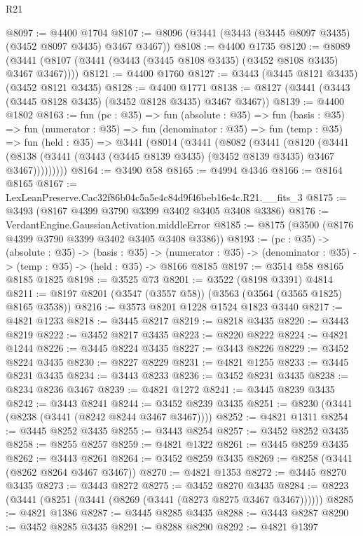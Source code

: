 \begin{lexlean}{R21}
\begin{coremodule}
@8097 := @4400 @1704
@8107 := @8096 (@3441 (@3443 (@3445 @8097 @3435) (@3452 @8097 @3435) @3467 @3467))
@8108 := @4400 @1735
@8120 := @8089 (@3441 (@8107 (@3441 (@3443 (@3445 @8108 @3435) (@3452 @8108 @3435) @3467 @3467))))
@8121 := @4400 @1760
@8127 := @3443 (@3445 @8121 @3435) (@3452 @8121 @3435)
@8128 := @4400 @1771
@8138 := @8127 (@3441 (@3443 (@3445 @8128 @3435) (@3452 @8128 @3435) @3467 @3467))
@8139 := @4400 @1802
@8163 := fun (pc : @35) =>
  fun (absolute : @35) =>
  fun (basis : @35) =>
  fun (numerator : @35) =>
  fun (denominator : @35) =>
  fun (temp : @35) =>
  fun (held : @35) =>
  @3441
    (@8014
      (@3441
        (@8082
          (@3441
            (@8120
              (@3441
                (@8138 (@3441 (@3443 (@3445 @8139 @3435) (@3452 @8139 @3435) @3467 @3467)))))))))
@8164 := @3490 @58
@8165 := @4994 @4346
@8166 := @8164 @8165
@8167 := LexLeanPreserve.Cac32f86b04c5a5e4c84d9f46beb16e4c.R21.__fits_3
@8175 := @3493 (@8167 @4399 @3790 @3399 @3402 @3405 @3408 @3386)
@8176 := VerdantEngine.GaussianActivation.middleError
@8185 := @8175 (@3500 (@8176 @4399 @3790 @3399 @3402 @3405 @3408 @3386))
@8193 := (pc : @35) ->
  (absolute : @35) ->
  (basis : @35) ->
  (numerator : @35) -> (denominator : @35) -> (temp : @35) -> (held : @35) -> @8166 @8185
@8197 := @3514 @58 @8165 @8185 @1825
@8198 := @3525 @73
@8201 := @3522 (@8198 @3391) @4814
@8211 := @8197 @8201 (@3547 (@3557 @58)) (@3563 (@3564 (@3565 @1825) @8165 @3538))
@8216 := @3573 @8201 @1228 @1524 @1823 @3440
@8217 := @4821 @1233
@8218 := @3445 @8217
@8219 := @8218 @3435
@8220 := @3443 @8219
@8222 := @3452 @8217 @3435
@8223 := @8220 @8222
@8224 := @4821 @1244
@8226 := @3445 @8224 @3435
@8227 := @3443 @8226
@8229 := @3452 @8224 @3435
@8230 := @8227 @8229
@8231 := @4821 @1255
@8233 := @3445 @8231 @3435
@8234 := @3443 @8233
@8236 := @3452 @8231 @3435
@8238 := @8234 @8236 @3467
@8239 := @4821 @1272
@8241 := @3445 @8239 @3435
@8242 := @3443 @8241
@8244 := @3452 @8239 @3435
@8251 := @8230 (@3441 (@8238 (@3441 (@8242 @8244 @3467 @3467))))
@8252 := @4821 @1311
@8254 := @3445 @8252 @3435
@8255 := @3443 @8254
@8257 := @3452 @8252 @3435
@8258 := @8255 @8257
@8259 := @4821 @1322
@8261 := @3445 @8259 @3435
@8262 := @3443 @8261
@8264 := @3452 @8259 @3435
@8269 := @8258 (@3441 (@8262 @8264 @3467 @3467))
@8270 := @4821 @1353
@8272 := @3445 @8270 @3435
@8273 := @3443 @8272
@8275 := @3452 @8270 @3435
@8284 := @8223 (@3441 (@8251 (@3441 (@8269 (@3441 (@8273 @8275 @3467 @3467))))))
@8285 := @4821 @1386
@8287 := @3445 @8285 @3435
@8288 := @3443 @8287
@8290 := @3452 @8285 @3435
@8291 := @8288 @8290
@8292 := @4821 @1397

\end{coremodule}
\end{lexlean}
